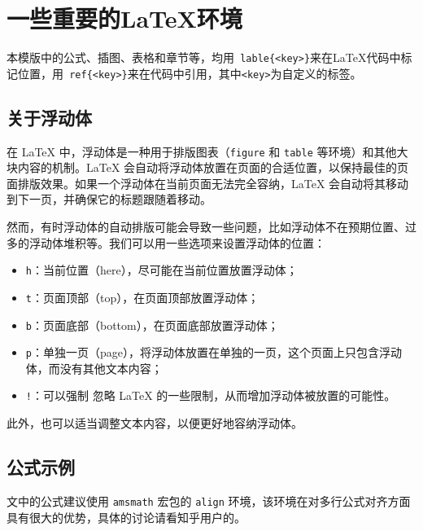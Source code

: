 \chapter{一些重要的\LaTeX{}环境}\label{chap:evm}

本模版中的公式、插图、表格和章节等，均用\texttt{ lable\{<key>\}}来在\LaTeX{}代码中标记位置，用\texttt{ ref\{<key>\}}来在代码中引用，其中\texttt{<key>}为自定义的标签。

\section{关于浮动体}
在 \LaTeX{} 中，浮动体是一种用于排版图表（\texttt{figure} 和 \texttt{table} 等环境）和其他大块内容的机制。\LaTeX{} 会自动将浮动体放置在页面的合适位置，以保持最佳的页面排版效果。如果一个浮动体在当前页面无法完全容纳，\LaTeX{} 会自动将其移动到下一页，并确保它的标题跟随着移动。

然而，有时浮动体的自动排版可能会导致一些问题，比如浮动体不在预期位置、过多的浮动体堆积等。我们可以用一些选项来设置浮动体的位置： 
\begin{itemize}
    \item \texttt{h}：当前位置（here），尽可能在当前位置放置浮动体；
    \item \texttt{t}：页面顶部（top），在页面顶部放置浮动体；
    \item \texttt{b}：页面底部（bottom），在页面底部放置浮动体；
    \item \texttt{p}：单独一页（page），将浮动体放置在单独的一页，这个页面上只包含浮动体，而没有其他文本内容；
    \item \texttt{!}：可以强制 忽略 \LaTeX{} 的一些限制，从而增加浮动体被放置的可能性。
\end{itemize}
此外，也可以适当调整文本内容，以便更好地容纳浮动体。

\section{公式示例}

文中的公式建议使用 \texttt{amsmath} 宏包的 \texttt{align} 环境，该环境在对多行公式对齐方面具有很大的优势，具体的讨论请看知乎用户\href{https://www.zhihu.com/people/bo-xue-duo-wen-63}{}的\href{https://www.zhihu.com/question/477805692/answer/2045084752}{}。

